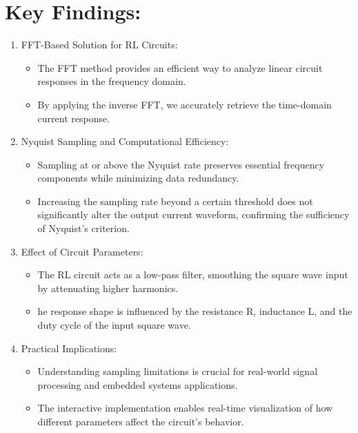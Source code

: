 \section{Key Findings: }
\begin{enumerate}
    \item FFT-Based Solution for RL Circuits:
    \begin{itemize}
        \item The FFT method provides an efficient way to analyze linear circuit responses in the frequency domain.
        \item By applying the inverse FFT, we accurately retrieve the time-domain current response.
    \end{itemize}
    \item Nyquist Sampling and Computational Efficiency:
    \begin{itemize}
        \item Sampling at or above the Nyquist rate preserves essential frequency components while minimizing data redundancy.
        \item Increasing the sampling rate beyond a certain threshold does not significantly alter the output current waveform, confirming the sufficiency of Nyquist's criterion.
    \end{itemize}
    \item Effect of Circuit Parameters:
    \begin{itemize}
        \item The RL circuit acts as a low-pass filter, smoothing the square wave input by attenuating higher harmonics.
        \item he response shape is influenced by the resistance R, inductance L, and the duty cycle of the input square wave.
    \end{itemize}
    \item Practical Implications:
    \begin{itemize}
        \item Understanding sampling limitations is crucial for real-world signal processing and embedded systems applications.
        \item The interactive implementation enables real-time visualization of how different parameters affect the circuit's behavior.
    \end{itemize}
\end{enumerate}